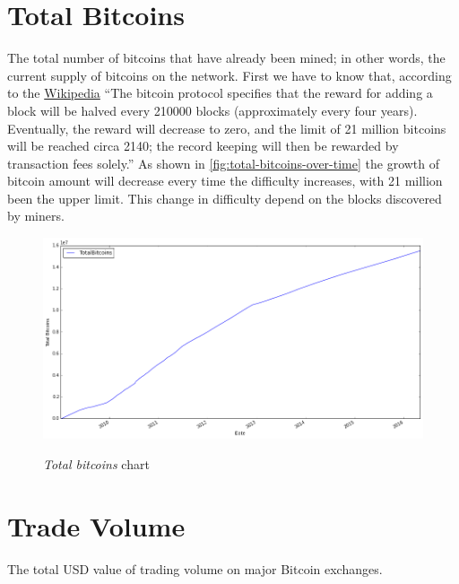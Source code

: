 
\section{Total Bitcoins}
\label{sec:total-bitcoins}

The total number of bitcoins that have already been mined; in other
words, the current supply of bitcoins on the network. First we have to
know that, according to the \href{}{Wikipedia} ``The bitcoin protocol
specifies that the reward for adding a block will be halved every
210000 blocks (approximately every four years). Eventually, the reward
will decrease to zero, and the limit of 21 million bitcoins will be
reached circa 2140; the record keeping will then be rewarded by
transaction fees solely.'' As shown in
\autoref{fig:total-bitcoins-over-time} the growth of bitcoin amount
will decrease every time the difficulty increases, with 21 million
been the upper limit. This change in difficulty depend on the blocks
discovered by miners.

\begin{figure}[bth]
  \myfloatalign
  {\includegraphics[width=1\linewidth]
    {gfx/total-bitcoins-over-time}}
  \caption{\textit{Total bitcoins} chart}
  \label{fig:total-bitcoins-over-time}
\end{figure}


\section{Trade Volume}
\label{sec:trade-volume}

The total USD value of trading volume on major Bitcoin exchanges.

